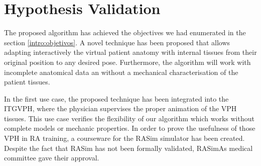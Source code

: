 \section{Hypothesis Validation}
\label{conclu:hipotesis}

The proposed algorithm has achieved the objectives we had enumerated in the section \ref{intro:objetivos}. A novel technique has been proposed that allows adapting interactively the virtual patient anatomy with internal tissues from their original position to any desired pose. Furthermore, the algorithm will work with incomplete anatomical data an without a mechanical characterisation of the patient tissues. %

In the first use case, the proposed technique has been integrated into the ITGVPH, where the physician supervises the proper animation of the VPH tissues. This use case verifies the flexibility of our algorithm which works without complete models or mechanic properties. In order to prove the usefulness of those VPH in RA training, a courseware for the RASim simulator has been created. Despite the fact that \acs{RASim} has not been formally validated, \acs{RASimAs} medical committee gave their approval. 







